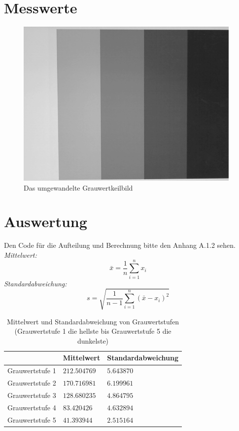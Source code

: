 \documentclass[12pt, oneside, a4paper, \docLanguage]{report}
\begin{document}
\section{Messwerte}
\label{chap:VERSUCH_1_MESSWERTE}
\begin{figure}[H]
	\centering\small
	\includegraphics[width=11cm]{bild1.png}
	\caption{Das umgewandelte Grauwertkeilbild}
\end{figure}
\section{Auswertung}
\label{chap:VERSUCH_1_AUSWERTUNG}
Den Code für die Aufteilung und Berechnung bitte den Anhang A.1.2 sehen.\\
\textit{Mittelwert: }	$$\bar{x} = \frac{1}{n}\sum_{i=1}^nx_i$$
\textit{Standardabweichung: }$$s=\sqrt{\frac{1}{n-1}\sum_{i=1}^n{(\bar{x}-x_i)}^2}$$
\begin{table}[H]
\centering
\begin{tabular}{|l|l|l|}
\hline
\multicolumn{1}{|c|}{} & \multicolumn{1}{c|}{Mittelwert} & \multicolumn{1}{c|}{Standardabweichung}\\ \hline
Grauwertstufe 1						&$212.504769$		&$5.643870$					\\ \hline
Grauwertstufe 2						&$170.716981$		&$6.199961$					\\ \hline
Grauwertstufe 3						&$128.680235$		&$4.864795$					\\ \hline
Grauwertstufe 4						&$83.420426$		&$4.632894$					\\ \hline
Grauwertstufe 5						&$41.393944$		&$2.515164$					\\ \hline
\end{tabular}
\caption{Mittelwert und Standardabweichung von Grauwertstufen (Grauwertstufe 1 die hellste bis Grauwertstufe 5 die dunkelste)}
\end{table}
\end{document}
